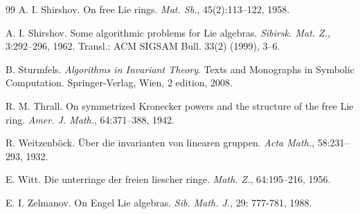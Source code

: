 \documentclass{cimart}
\begin{document}
\begin{thebibliography}{99}
 A. I. Shirshov. On free Lie rings. {\it Mat. Sb.}, 45(2):113–122, 1958.

 A. I. Shirshov. Some algorithmic problems for Lie algebras. {\it Sibirsk. Mat. Z.}, 3:292–296, 1962. Transl.: ACM SIGSAM Bull. 33(2) (1999), 3–6.

 B. Sturmfels. {\it Algorithms in Invariant Theory}. Texts and Monographs in Symbolic Computation. Springer-Verlag, Wien, 2 edition, 2008.

 R. M. Thrall. On symmetrized Kronecker powers and the structure of the free Lie ring. {\it Amer. J. Math.}, 64:371–388, 1942.

 R. Weitzenb\"ock. \"Uber die invarianten von linearen gruppen. {\it Acta Math.}, 58:231–293, 1932.

 E. Witt. Die unterringe der freien liescher ringe. {\it Math. Z.}, 64:195–216, 1956.

 E. I. Zelmanov. On Engel Lie algebras. {\it Sib. Math. J.}, 29: 777-781, 1988.
\end{thebibliography}


\end{document}
